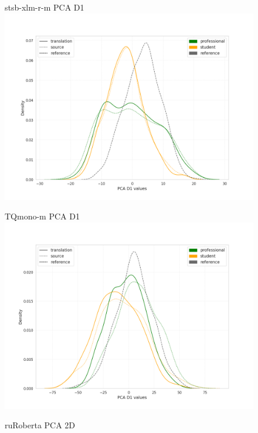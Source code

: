 \begin{figure}[H]
	\begin{minipage}[c]{0.31\linewidth}
	\centering
	stsb-xlm-r-m PCA D1 
	\includegraphics[width=\linewidth]{figures/pca/src-var-ttype-mXLM-R-PCA-D1-lines}
\end{minipage}	
\begin{minipage}[c]{0.31\linewidth}
	\centering
	TQmono-m PCA D1
	\includegraphics[width=\linewidth]{figures/pca/src-var-ttype-TQmono-m-PCA-D1-lines}
\end{minipage}
\begin{minipage}[c]{0.31\linewidth}
	\centering
	ruRoberta PCA 2D

\end{minipage}
\end{figure}
